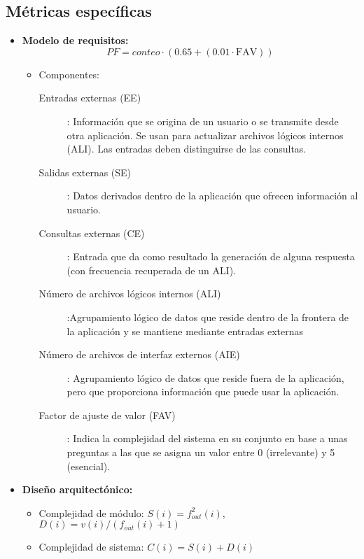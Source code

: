     \subsection{Métricas específicas}\label{subsec:metricas-especificas}

    \begin{itemize}
        \item \textbf{Modelo de requisitos:}
        \[PF = conteo \cdot (0.65 + (0.01 \cdot \text{FAV}))\]
        \begin{itemize}
            \item Componentes:
            \begin{description}
                \item[Entradas externas (EE)]: Información que se origina de un usuario o se transmite desde otra aplicación.
                Se usan para actualizar archivos lógicos internos (ALI). Las entradas deben distinguirse de las consultas.
                \item[Salidas externas (SE)]: Datos derivados dentro de la aplicación que ofrecen información al usuario.
                \item [Consultas externas (CE)]: Entrada que da como resultado la generación de alguna respuesta (con frecuencia recuperada de un ALI).
                \item[Número de archivos lógicos internos (ALI)]:Agrupamiento lógico de datos que reside dentro de la frontera de la aplicación y se mantiene mediante entradas externas
                \item[Número de archivos de interfaz externos (AIE)]:
                Agrupamiento lógico de datos que reside fuera de la aplicación, pero que proporciona información que puede usar la aplicación.
                \item [Factor de ajuste de valor (FAV)]: Indica la complejidad del sistema en su conjunto en base a unas preguntas a las que se asigna un valor entre 0 (irrelevante) y 5 (esencial).
            \end{description}
        \end{itemize}

        \item \textbf{Diseño arquitectónico:}
        \begin{itemize}
            \item Complejidad de módulo: $S(i) = f^2_{out}(i)$, $D(i) = v(i) / (f_{out}(i) + 1)$
            \item Complejidad de sistema: $C(i) = S(i) + D(i)$
        \end{itemize}


\end{itemize}
